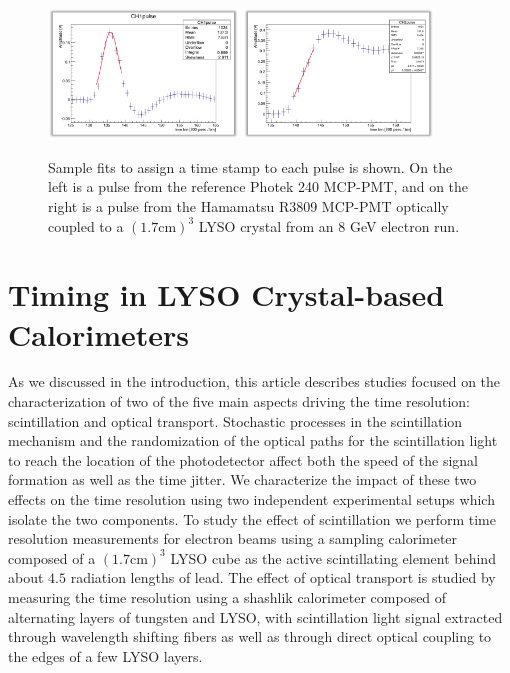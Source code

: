\documentclass[12pt]{article}
\begin{document}
\begin{figure}[h] \centering
\includegraphics[width=0.45\textwidth]{figs/RefPulseFit} 
\includegraphics[width=0.45\textwidth]{figs/ScintPulseFit} 
\caption{Sample fits to assign a time stamp to each pulse is shown. 
On the left is a pulse from the reference Photek 240 MCP-PMT, and
on the right is a pulse from the Hamamatsu R3809 MCP-PMT
optically coupled to a $(1.7\mathrm{ cm})^3$  LYSO crystal
from an 8 GeV electron run.}
\label{fig:PulseFits}
\end{figure}


\section{Timing in LYSO Crystal-based Calorimeters}

As we discussed in the introduction, this article describes studies
focused on the characterization of two of the five main aspects
driving the time resolution: scintillation and 
optical transport. Stochastic processes in the scintillation
mechanism and the randomization of the optical paths for the 
scintillation light to reach the location of the photodetector 
affect both the speed of the signal formation
as well as the time jitter. We characterize the impact of
these two effects on the time resolution using
two independent experimental setups which isolate the
two components. To study the effect of scintillation
we perform time resolution measurements
for electron beams using a sampling calorimeter composed of a 
$(1.7\mathrm{ cm})^{3}$ LYSO cube as the active 
scintillating element behind about $4.5$ radiation lengths of lead. 
The effect of optical transport is studied by measuring
the time resolution using a shashlik 
calorimeter composed of alternating layers of tungsten
and LYSO, with scintillation light signal extracted
through wavelength shifting fibers as well as 
through direct optical coupling to the edges of a few
LYSO layers. 
\end{document}
